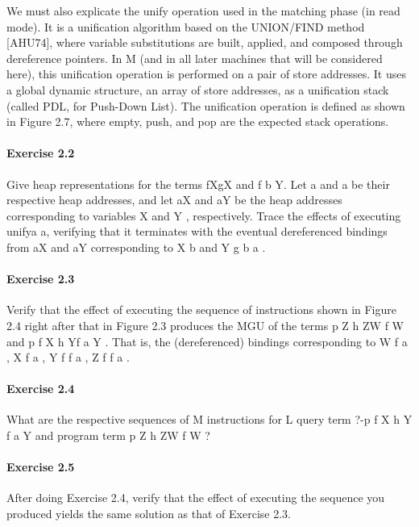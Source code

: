 We must also explicate the unify operation used in the matching phase (in read
mode). It is a unification algorithm based on the UNION/FIND method [AHU74],
where variable substitutions are built, applied, and composed through dereference
pointers. In M
(and in all later machines that will be considered here), this
unification operation is performed on a pair of store addresses. It uses a global
dynamic structure, an array of store addresses, as a unification stack (called PDL,
for Push-Down List). The unification operation is defined as shown in Figure 2.7,
where empty, push, and pop are the expected stack operations.

\paragraph{Exercise 2.2} Give heap representations for the terms fXgX and f b Y.
Let a and a be their respective heap addresses, and let aX and aY be the heap
addresses corresponding to variables X and Y , respectively. Trace the effects
of executing unifya a, verifying that it terminates with the eventual
dereferenced bindings from aX and aY corresponding to X
 b and Y g b a .
 
\paragraph{Exercise 2.3} Verify that the effect of executing the sequence of
instructions shown in Figure 2.4 right after that in Figure 2.3 produces the MGU
of the terms p Z h ZW  f  W and p f  X  h Yf  a   Y  . That is, the
(dereferenced) bindings corresponding to W
 f  a , X f  a , Y f  f  a  , Z f  f  a  .

\paragraph{Exercise 2.4} What are the respective sequences of M instructions for
L query term ?-p f  X  h Y f  a   Y   and program term p Z h ZW  f  W  ?

\paragraph{Exercise 2.5} After doing Exercise 2.4, verify that the effect of
executing the sequence you produced yields the same solution as that of Exercise
2.3.